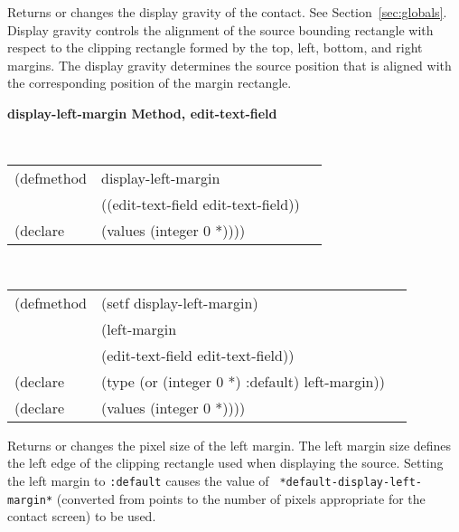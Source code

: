 \begin{flushright} \parbox[t]{6.125in}{
Returns or changes the display gravity of the contact.
See Section~\ref{sec:globals}. Display gravity controls the alignment of the
source bounding rectangle with respect to the clipping rectangle formed by the
top, left, bottom, and right margins. The display gravity determines the source
position that is aligned with the corresponding position of the margin
rectangle.  
}
\end{flushright}




{\samepage  
{\large {\bf display-left-margin \hfill Method, edit-text-field}}
\begin{flushright} \parbox[t]{6.125in}{
\tt
\begin{tabular}{lll}
\raggedright
(defmethod & display-left-margin & \\
& ((edit-text-field  edit-text-field)) \\
(declare & (values (integer 0 *))))
\end{tabular}
\rm

}\end{flushright}}

\begin{flushright} \parbox[t]{6.125in}{
\tt
\begin{tabular}{lll}
\raggedright
(defmethod & (setf display-left-margin) & \\
         & (left-margin \\
         & (edit-text-field  edit-text-field)) \\
(declare &(type (or (integer 0 *) :default)  left-margin))\\
(declare & (values (integer 0 *))))
\end{tabular}
\rm}
\end{flushright}

\begin{flushright} \parbox[t]{6.125in}{
Returns or changes the pixel size of the
left margin.  The left margin size defines
the left edge of the clipping rectangle used when displaying the source.
Setting the left margin to {\tt :default} causes the value of {\tt
*default-display-left-margin*} (converted from points to the number of pixels
appropriate for the contact screen) to be used.
}
\end{flushright}





